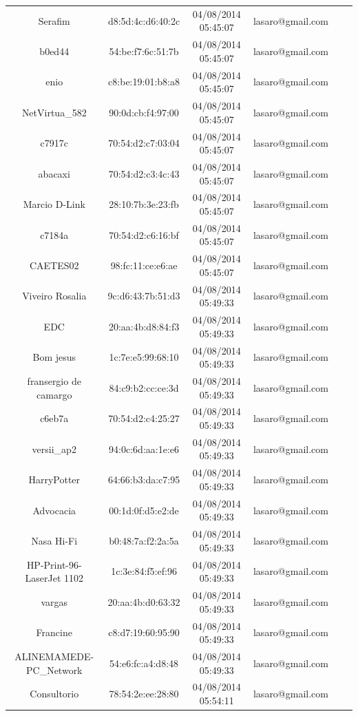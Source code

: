 \documentclass[12pt, %
openright, 
oneside,
a4paper,
brazil]{facom-ufu-abntex2}
\begin{document}
\begin{table}
\begin{longtable}{|c|c|c|c|c|c|}
Serafim & d8:5d:4c:d6:40:2c & 04/08/2014 05:45:07 & lasaro@gmail.com \\
b0ed44 & 54:be:f7:6c:51:7b & 04/08/2014 05:45:07 & lasaro@gmail.com \\
enio & c8:be:19:01:b8:a8 & 04/08/2014 05:45:07 & lasaro@gmail.com \\
NetVirtua\_582 & 90:0d:cb:f4:97:00 & 04/08/2014 05:45:07 & lasaro@gmail.com \\
c7917c & 70:54:d2:c7:03:04 & 04/08/2014 05:45:07 & lasaro@gmail.com \\
abacaxi & 70:54:d2:c3:4c:43 & 04/08/2014 05:45:07 & lasaro@gmail.com \\
Marcio D-Link & 28:10:7b:3e:23:fb & 04/08/2014 05:45:07 & lasaro@gmail.com \\
c7184a & 70:54:d2:c6:16:bf & 04/08/2014 05:45:07 & lasaro@gmail.com \\
CAETES02 & 98:fc:11:ce:e6:ae & 04/08/2014 05:45:07 & lasaro@gmail.com \\
Viveiro Rosalia & 9c:d6:43:7b:51:d3 & 04/08/2014 05:49:33 & lasaro@gmail.com \\
EDC & 20:aa:4b:d8:84:f3 & 04/08/2014 05:49:33 & lasaro@gmail.com \\
Bom jesus & 1c:7e:e5:99:68:10 & 04/08/2014 05:49:33 & lasaro@gmail.com \\
fransergio de camargo & 84:c9:b2:cc:ce:3d & 04/08/2014 05:49:33 & lasaro@gmail.com \\
c6eb7a & 70:54:d2:c4:25:27 & 04/08/2014 05:49:33 & lasaro@gmail.com \\
versii\_ap2 & 94:0c:6d:aa:1e:e6 & 04/08/2014 05:49:33 & lasaro@gmail.com \\
HarryPotter & 64:66:b3:da:c7:95 & 04/08/2014 05:49:33 & lasaro@gmail.com \\
Advocacia & 00:1d:0f:d5:e2:de & 04/08/2014 05:49:33 & lasaro@gmail.com \\
Nasa Hi-Fi & b0:48:7a:f2:2a:5a & 04/08/2014 05:49:33 & lasaro@gmail.com \\
HP-Print-96-LaserJet 1102 & 1c:3e:84:f5:ef:96 & 04/08/2014 05:49:33 & lasaro@gmail.com \\
vargas & 20:aa:4b:d0:63:32 & 04/08/2014 05:49:33 & lasaro@gmail.com \\
Francine & c8:d7:19:60:95:90 & 04/08/2014 05:49:33 & lasaro@gmail.com \\
ALINEMAMEDE-PC\_Network & 54:e6:fc:a4:d8:48 & 04/08/2014 05:49:33 & lasaro@gmail.com \\
Consultorio & 78:54:2e:ee:28:80 & 04/08/2014 05:54:11 & lasaro@gmail.com \\

\end{longtable}
\end{table}
\end{document}
